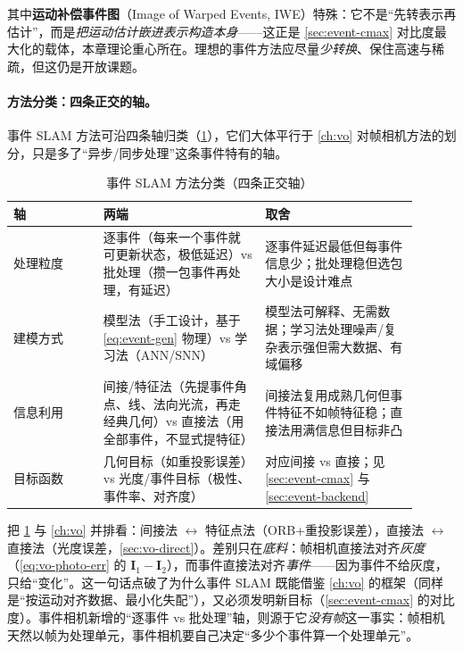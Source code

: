 \noindent 其中\textbf{运动补偿事件图}（Image of Warped Events, IWE）特殊：它不是“先转表示再估计”，而是\emph{把运动估计嵌进表示构造本身}——这正是 \cref{sec:event-cmax} 对比度最大化的载体，本章理论重心所在。理想的事件方法应尽量\emph{少转换}、保住高速与稀疏，但这仍是开放课题\cite{gallego2022eventsurvey}。

\paragraph{方法分类：四条正交的轴。}
事件 SLAM 方法可沿四条轴归类（\cref{tab:event-taxonomy}），它们大体平行于 \cref{ch:vo} 对帧相机方法的划分，只是多了“异步/同步处理”这条事件特有的轴。

\begin{table}[H]\centering\small
\caption{事件 SLAM 方法分类（四条正交轴）}
\label{tab:event-taxonomy}
\begin{tabular}{p{0.20\linewidth}p{0.36\linewidth}p{0.34\linewidth}}
\toprule
轴 & 两端 & 取舍 \\
\midrule
处理粒度 & 逐事件（每来一个事件就可更新状态，极低延迟）vs 批处理（攒一包事件再处理，有延迟）& 逐事件延迟最低但每事件信息少；批处理稳但选包大小是设计难点 \\
建模方式 & 模型法（手工设计，基于 \cref{eq:event-gen} 物理）vs 学习法（ANN/SNN）& 模型法可解释、无需数据；学习法处理噪声/复杂表示强但需大数据、有域偏移 \\
信息利用 & 间接/特征法（先提事件角点、线、法向光流，再走经典几何）vs 直接法（用全部事件，不显式提特征）& 间接法复用成熟几何但事件特征不如帧特征稳；直接法用满信息但目标非凸 \\
目标函数 & 几何目标（如重投影误差）vs 光度/事件目标（极性、事件率、对齐度）& 对应间接 vs 直接；见 \cref{sec:event-cmax} 与 \cref{sec:event-backend} \\
\bottomrule
\end{tabular}
\end{table}

\begin{insight}[与帧相机方法的严格对应]
把 \cref{tab:event-taxonomy} 与 \cref{ch:vo} 并排看：间接法 $\leftrightarrow$ 特征点法（ORB+重投影误差），直接法 $\leftrightarrow$ 直接法（光度误差，\cref{sec:vo-direct}）。差别只在\emph{底料}：帧相机直接法对齐\emph{灰度}（\cref{eq:vo-photo-err} 的 $\mathbf I_1-\mathbf I_2$），而事件直接法对齐\emph{事件}——因为事件不给灰度，只给“变化”。这一句话点破了为什么事件 SLAM 既能借鉴 \cref{ch:vo} 的框架（同样是“按运动对齐数据、最小化失配”），又必须发明新目标（\cref{sec:event-cmax} 的对比度）。事件相机新增的“逐事件 vs 批处理”轴，则源于它\emph{没有帧}这一事实：帧相机天然以帧为处理单元，事件相机要自己决定“多少个事件算一个处理单元”。
\end{insight}

